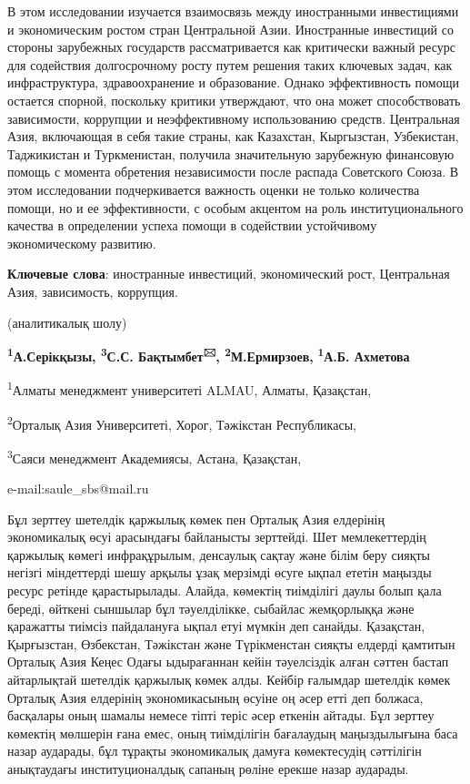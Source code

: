 В этом исследовании изучается взаимосвязь между иностранными
инвестициями и экономическим ростом стран Центральной Азии. Иностранные
инвестиций со стороны зарубежных государств рассматривается как
критически важный ресурс для содействия долгосрочному росту путем
решения таких ключевых задач, как инфраструктура, здравоохранение и
образование. Однако эффективность помощи остается спорной, поскольку
критики утверждают, что она может способствовать зависимости, коррупции
и неэффективному использованию средств. Центральная Азия, включающая в
себя такие страны, как Казахстан, Кыргызстан, Узбекистан, Таджикистан и
Туркменистан, получила значительную зарубежную финансовую помощь с
момента обретения независимости после распада Советского Союза. В этом
исследовании подчеркивается важность оценки не только количества помощи,
но и ее эффективности, с особым акцентом на роль институционального
качества в определении успеха помощи в содействии устойчивому
экономическому развитию.

{\bfseries Ключевые слова}: иностранные инвестиций, экономический рост,
Центральная Азия, зависимость, коррупция.


\begin{center}
(аналитикалық шолу)

{\bfseries \textsuperscript{1}А.Серікқызы, \textsuperscript{3}С.С.
Бақтымбет\textsuperscript{🖂}, \textsuperscript{2}М.Ермирзоев,}
{\bfseries \textsuperscript{1}А.Б. Ахметова}

\textsuperscript{1}Алматы менеджмент университеті ALMAU, Алматы,
Қазақстан,

\textsuperscript{2}Орталық Азия Университеті, Хорог, Тәжікстан
Республикасы,

\textsuperscript{3}Саяси менеджмент Академиясы, Астана, Қазақстан,

e-mail:saule\_sbs@mail.ru
\end{center}

Бұл зерттеу шетелдік қаржылық көмек пен Орталық Азия елдерінің
экономикалық өсуі арасындағы байланысты зерттейді. Шет мемлекеттердің
қаржылық көмегі инфрақұрылым, денсаулық сақтау және білім беру сияқты
негізгі міндеттерді шешу арқылы ұзақ мерзімді өсуге ықпал ететін маңызды
ресурс ретінде қарастырылады. Алайда, көмектің тиімділігі даулы болып
қала береді, өйткені сыншылар бұл тәуелділікке, сыбайлас жемқорлыққа
және қаражатты тиімсіз пайдалануға ықпал етуі мүмкін деп санайды.
Қазақстан, Қырғызстан, Өзбекстан, Тәжікстан және Түрікменстан сияқты
елдерді қамтитын Орталық Азия Кеңес Одағы ыдырағаннан кейін тәуелсіздік
алған сәттен бастап айтарлықтай шетелдік қаржылық көмек алды. Кейбір
ғалымдар шетелдік көмек Орталық Азия елдерінің экономикасының өсуіне оң
әсер етті деп болжаса, басқалары оның шамалы немесе тіпті теріс әсер
еткенін айтады. Бұл зерттеу көмектің мөлшерін ғана емес, оның
тиімділігін бағалаудың маңыздылығына баса назар аударады, бұл тұрақты
экономикалық дамуға көмектесудің сәттілігін анықтаудағы институционалдық
сапаның рөліне ерекше назар аударады.

